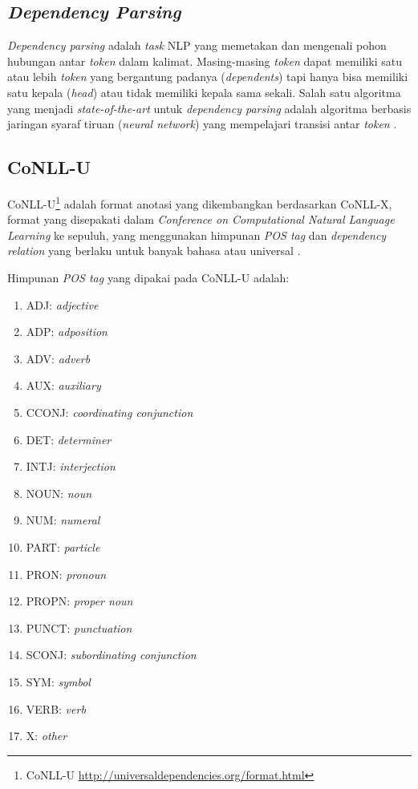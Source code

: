 \subsection{\textit{Dependency Parsing}}

\textit{Dependency parsing} adalah \textit{task} NLP yang memetakan dan mengenali pohon hubungan antar \textit{token} dalam kalimat. Masing-masing \textit{token} dapat memiliki satu atau lebih \textit{token} yang bergantung padanya (\textit{dependents}) tapi hanya bisa memiliki satu kepala (\textit{head}) atau tidak memiliki kepala sama sekali. Salah satu algoritma yang menjadi \textit{state-of-the-art} untuk \textit{dependency parsing} adalah algoritma berbasis jaringan syaraf tiruan (\textit{neural network}) yang mempelajari transisi antar \textit{token} \citep{chen2014fast}. 

\subsection{CoNLL-U}

CoNLL-U\footnote{CoNLL-U \url{http://universaldependencies.org/format.html}} adalah format anotasi yang dikembangkan berdasarkan CoNLL-X, format yang disepakati dalam \textit{Conference on Computational Natural Language Learning} ke sepuluh, yang menggunakan himpunan \textit{POS tag} dan \textit{dependency relation} yang berlaku untuk banyak bahasa atau universal \citep{nivre2016universal}.

Himpunan \textit{POS tag} yang dipakai pada CoNLL-U adalah:
\begin{multicols}{2}
	\begin{enumerate}
		\item ADJ: \textit{adjective}
		\item ADP: \textit{adposition}
		\item ADV: \textit{adverb}
		\item AUX: \textit{auxiliary}
		\item CCONJ: \textit{coordinating conjunction}
		\item DET: \textit{determiner}
		\item INTJ: \textit{interjection}
		\item NOUN: \textit{noun}
		\item NUM: \textit{numeral}
		\item PART: \textit{particle}
		\item PRON: \textit{pronoun}
		\item PROPN: \textit{proper noun}
		\item PUNCT: \textit{punctuation}
		\item SCONJ: \textit{subordinating conjunction}
		\item SYM: \textit{symbol}
		\item VERB: \textit{verb}
		\item X: \textit{other}
	\end{enumerate}
\end{multicols}

